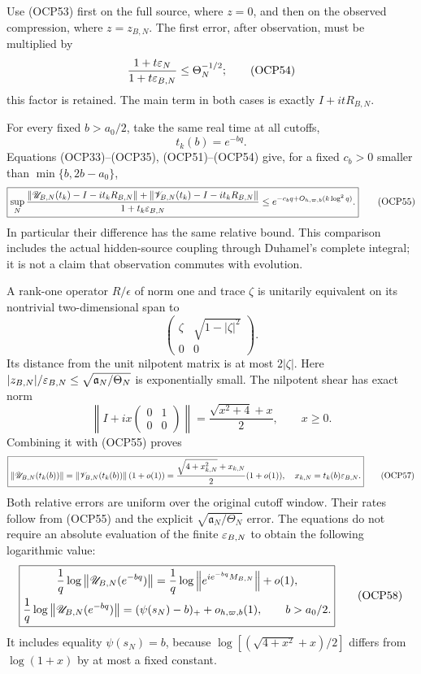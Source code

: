 \documentclass[10pt]{article}
\begin{document}
Use (OCP53) first on the full source, where $z=0$, and then on the observed compression, where $z=z_{B,N}$. The first error, after observation, must be multiplied by
\[
 \frac{1+t\varepsilon_N}{1+t\varepsilon_{B,N}}
 \le\Theta_N^{-1/2};
 \tag{OCP54}
\]
this factor is retained. The main term in both cases is exactly $I+itR_{B,N}$.

For every fixed $b>a_0/2$, take the same real time at all cutoffs,
\[
 t_k(b)=e^{-bq}.
\]
Equations (OCP33)--(OCP35), (OCP51)--(OCP54) give, for a fixed $c_b>0$ smaller than $\min\{b,2b-a_0\}$,
\[
 \boxed{
 \sup_N\frac{
 \left\lVert\mathscr U_{B,N}(t_k)-I-it_kR_{B,N}\right\rVert
 +\left\lVert\mathscr V_{B,N}(t_k)-I-it_kR_{B,N}\right\rVert
 }{1+t_k\varepsilon_{B,N}}
 \le e^{-c_bq+O_{h,\varpi,b}(k\log^2q)}.}
 \tag{OCP55}
\]
In particular their difference has the same relative bound. This comparison includes the actual hidden-source coupling through Duhamel's complete integral; it is not a claim that observation commutes with evolution.

A rank-one operator $R/\epsilon$ of norm one and trace $\zeta$ is unitarily equivalent on its nontrivial two-dimensional span to
\[
 \begin{pmatrix}\zeta&\sqrt{1-|\zeta|^2}\\0&0\end{pmatrix}.
\]
Its distance from the unit nilpotent matrix is at most $2|\zeta|$. Here $|z_{B,N}|/\varepsilon_{B,N}\le\sqrt{\mathfrak a_N/\Theta_N}$ is exponentially small. The nilpotent shear has exact norm
\[
 \left\|I+ix\begin{pmatrix}0&1\\0&0\end{pmatrix}\right\|
 =\frac{\sqrt{x^2+4}+x}{2},\qquad x\ge0.
 \tag{OCP56}
\]
Combining it with (OCP55) proves
\[
 \boxed{
 \left\lVert\mathscr U_{B,N}(t_k(b))\right\rVert
 =\left\lVert\mathscr V_{B,N}(t_k(b))\right\rVert(1+o(1))
 =\frac{\sqrt{4+x_{k,N}^2}+x_{k,N}}{2}(1+o(1)),
 \quad x_{k,N}=t_k(b)\varepsilon_{B,N}.}
 \tag{OCP57}
\]
Both relative errors are uniform over the original cutoff window. Their rates follow from (OCP55) and the explicit $\sqrt{\mathfrak a_N/\Theta_N}$ error. The equations do not require an absolute evaluation of the finite $\varepsilon_{B,N}$ to obtain the following logarithmic value:
\[
 \boxed{\begin{gathered}
 \frac1q\log\left\lVert\mathscr U_{B,N}(e^{-bq})\right\rVert
 =\frac1q\log\left\lVert e^{ie^{-bq}M_{B,N}}\right\rVert+o(1),\\
 \frac1q\log\left\lVert\mathscr U_{B,N}(e^{-bq})\right\rVert
 =(\psi(s_N)-b)_++o_{h,\varpi,b}(1),\qquad b>a_0/2.
 \end{gathered}}
 \tag{OCP58}
\]
It includes equality $\psi(s_N)=b$, because
$\log[(\sqrt{4+x^2}+x)/2]$ differs from $\log(1+x)$ by at most a fixed constant.
\end{document}
